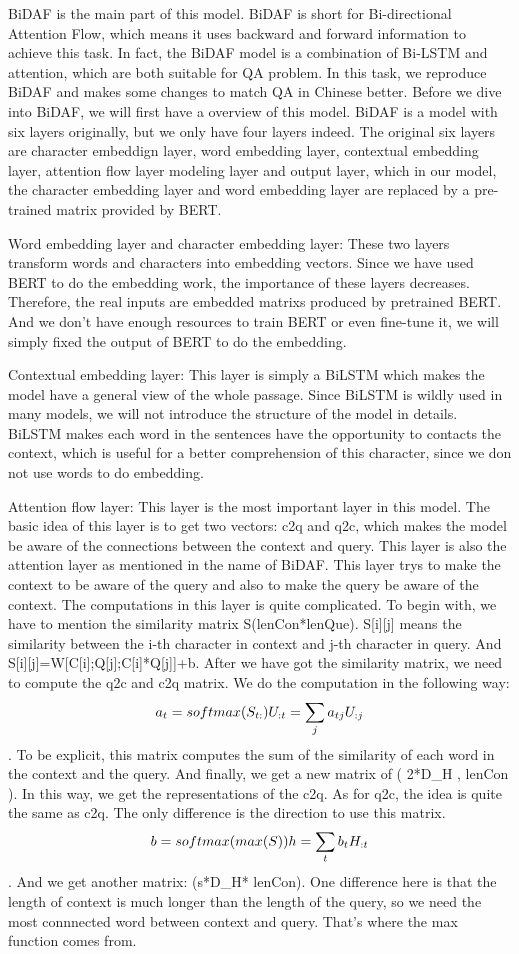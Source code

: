 \documentclass{article}
\begin{document}
BiDAF is the main part of this model. BiDAF is short for Bi-directional Attention Flow, which means it uses backward and forward information to achieve this task. In fact, the BiDAF model is a combination of Bi-LSTM and attention, which are both suitable for QA problem.
In this task, we reproduce BiDAF and makes some changes to match QA in Chinese better. Before we dive into BiDAF, we will first have a overview of this model. BiDAF is a model with six layers originally, but we only have four layers indeed. The original six layers are character embeddign layer, word embedding layer, contextual embedding layer, attention flow layer modeling layer and output layer, which in our model, the character embedding layer and word embedding layer are replaced by a pre-trained matrix provided by BERT. 

Word embedding layer and character embedding layer: These two layers transform words and characters into embedding vectors. Since we have used BERT to do the embedding work, the importance of these layers decreases. Therefore, the real inputs are embedded matrixs produced by pretrained BERT. And we don't have enough resources to train BERT or even fine-tune it, we will simply fixed the output of BERT to do the embedding.

Contextual embedding layer: This layer is simply a BiLSTM which makes the model have a general view of the whole passage. Since BiLSTM is wildly used in many models, we will not introduce the structure of the model in details. BiLSTM makes each word in the sentences have the opportunity to contacts the context, which is useful for a better comprehension of this character, since we don not use words to do embedding.

Attention flow layer: This layer is the most important layer in this model. The basic idea of this layer is to get two vectors: c2q and q2c, which makes the model be aware of the connections between the context and query. This layer is also the attention layer as mentioned in the name of BiDAF. This layer trys to make the context to be aware of the query and also to make the query be aware of the context. The computations in this layer is quite complicated. 
To begin with, we have to mention the similarity matrix S(lenCon*lenQue). S[i][j] means the similarity between the i-th character in context and j-th character in query. And S[i][j]=W[C[i];Q[j];C[i]*Q[j]]+b.
After we have got the similarity matrix, we need to compute the q2c and c2q matrix. We do the computation in the following way: $$a_t=softmax(S_{t:})\\U_{:t}=\sum_{j}a_{tj}U_{:j}$$. To be explicit, this matrix computes the sum of the similarity of each word in the context and the query. And finally, we get a new matrix of ( 2*D_H , lenCon ). In this way, we get the representations of the c2q. 
As for q2c, the idea is quite the same as c2q. The only difference is the direction to use this matrix. $$b=softmax(max(S))\\h=\sum_tb_tH_{:t}$$. And we get another matrix: (s*D_H* lenCon). One difference here is that the length of context is much longer than the length of the query, so we need the most connnected word between context and query. That's where the max function comes from.
\end{document}
